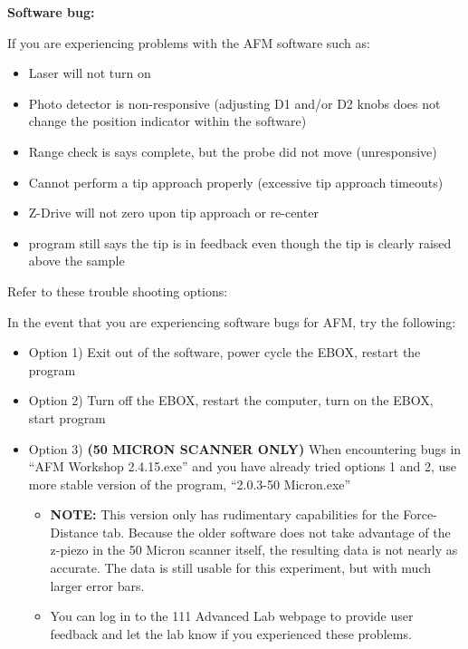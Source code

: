 \documentclass{../lab}
\begin{document}
\textbf{Software bug:}

If you are experiencing problems with the AFM software such as:

\begin{itemize}
    \item Laser will not turn on

    \item Photo detector is non-responsive (adjusting D1 and/or D2 knobs does not change the position indicator within the software)

    \item Range check is says complete, but the probe did not move (unresponsive)

    \item Cannot perform a tip approach properly (excessive tip approach timeouts)

    \item Z-Drive will not zero upon tip approach or re-center

    \item program still says the tip is in feedback even though the tip is clearly raised above the sample

\end{itemize}

Refer to these trouble shooting options:

In the event that you are experiencing software bugs for AFM, try the following:

\begin{itemize}
    \item Option 1) Exit out of the software, power cycle the EBOX, restart the program

    \item Option 2) Turn off the EBOX, restart the computer, turn on the EBOX, start program

    \item Option 3) \textbf{(50 MICRON SCANNER ONLY)} When encountering bugs in ``AFM Workshop 2.4.15.exe'' and you have already tried options 1 and 2, use more stable version of the program, ``2.0.3-50 Micron.exe''
    \begin{itemize}
        \item \textbf{NOTE:} This version only has rudimentary capabilities for the Force-Distance tab.  Because the older software does not take advantage of the z-piezo in the 50 Micron scanner itself, the resulting data is not nearly as accurate.  The data is still usable for this experiment, but with much larger error bars.

        \item You can log in to the 111 Advanced Lab webpage to provide user feedback and let the lab know if you experienced these problems.

    \end{itemize}

\end{itemize}
\end{document}
